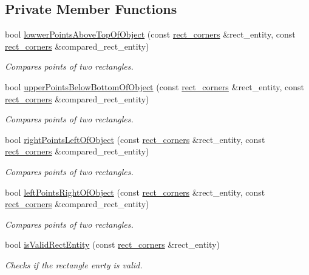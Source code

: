 \subsection*{Private Member Functions}
\begin{DoxyCompactItemize}
\item 
bool \hyperlink{classGeometryEngine_a8fd91015b4dbafc76217bb256632aedd}{lowwer\-Points\-Above\-Top\-Of\-Object} (const \hyperlink{structrect__corners}{rect\-\_\-corners} \&rect\-\_\-entity, const \hyperlink{structrect__corners}{rect\-\_\-corners} \&compared\-\_\-rect\-\_\-entity)
\begin{DoxyCompactList}\small\item\em Compares points of two rectangles. \end{DoxyCompactList}\item 
bool \hyperlink{classGeometryEngine_a955c93af2213f83674fb80ebbc76529e}{upper\-Points\-Below\-Bottom\-Of\-Object} (const \hyperlink{structrect__corners}{rect\-\_\-corners} \&rect\-\_\-entity, const \hyperlink{structrect__corners}{rect\-\_\-corners} \&compared\-\_\-rect\-\_\-entity)
\begin{DoxyCompactList}\small\item\em Compares points of two rectangles. \end{DoxyCompactList}\item 
bool \hyperlink{classGeometryEngine_a88fe436f5cce8f04bf817b52b33e6735}{right\-Points\-Left\-Of\-Object} (const \hyperlink{structrect__corners}{rect\-\_\-corners} \&rect\-\_\-entity, const \hyperlink{structrect__corners}{rect\-\_\-corners} \&compared\-\_\-rect\-\_\-entity)
\begin{DoxyCompactList}\small\item\em Compares points of two rectangles. \end{DoxyCompactList}\item 
bool \hyperlink{classGeometryEngine_a869816b96ce4df08975363692a4a5f7d}{left\-Points\-Right\-Of\-Object} (const \hyperlink{structrect__corners}{rect\-\_\-corners} \&rect\-\_\-entity, const \hyperlink{structrect__corners}{rect\-\_\-corners} \&compared\-\_\-rect\-\_\-entity)
\begin{DoxyCompactList}\small\item\em Compares points of two rectangles. \end{DoxyCompactList}\item 
bool \hyperlink{classGeometryEngine_a2ad4dc1a141e3f06b78fe862d9738fbc}{is\-Valid\-Rect\-Entity} (const \hyperlink{structrect__corners}{rect\-\_\-corners} \&rect\-\_\-entity)
\begin{DoxyCompactList}\small\item\em Checks if the rectangle enrty is valid. \end{DoxyCompactList}\end{DoxyCompactItemize}


